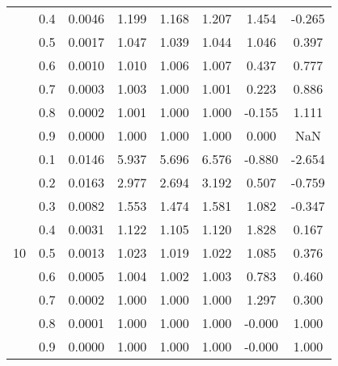 \documentclass[11pt,a4paper]{report}
\begin{document}
\begin{longtable}{ | c | c || c | c | c | c | c | c | }
 & 0.4 & 0.0046 & 1.199 & 1.168 & 1.207 & 1.454 & -0.265 \\
 & 0.5 & 0.0017 & 1.047 & 1.039 & 1.044 & 1.046 & 0.397 \\
 & 0.6 & 0.0010 & 1.010 & 1.006 & 1.007 & 0.437 & 0.777 \\
 & 0.7 & 0.0003 & 1.003 & 1.000 & 1.001 & 0.223 & 0.886 \\
 & 0.8 & 0.0002 & 1.001 & 1.000 & 1.000 & -0.155 & 1.111 \\
 & 0.9 & 0.0000 & 1.000 & 1.000 & 1.000 & 0.000 & NaN \\
 \hline
\multirow{9}{*}{10} & 0.1 & 0.0146 & 5.937 & 5.696 & 6.576 & -0.880 & -2.654 \\
 & 0.2 & 0.0163 & 2.977 & 2.694 & 3.192 & 0.507 & -0.759 \\
 & 0.3 & 0.0082 & 1.553 & 1.474 & 1.581 & 1.082 & -0.347 \\
 & 0.4 & 0.0031 & 1.122 & 1.105 & 1.120 & 1.828 & 0.167 \\
 & 0.5 & 0.0013 & 1.023 & 1.019 & 1.022 & 1.085 & 0.376 \\
 & 0.6 & 0.0005 & 1.004 & 1.002 & 1.003 & 0.783 & 0.460 \\
 & 0.7 & 0.0002 & 1.000 & 1.000 & 1.000 & 1.297 & 0.300 \\
 & 0.8 & 0.0001 & 1.000 & 1.000 & 1.000 & -0.000 & 1.000 \\
 & 0.9 & 0.0000 & 1.000 & 1.000 & 1.000 & -0.000 & 1.000 \\
 \hline
\hline
\end{longtable}
\end{document}
